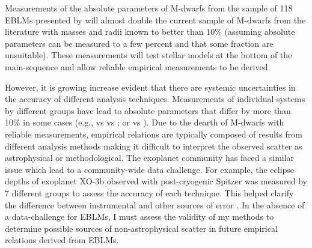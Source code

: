Measurements of the absolute parameters of M-dwarfs from the sample of 118 EBLMs presented by \citet{Triaud2017} will almost double the current sample of M-dwarfs from the literature with masses and radii known to better than 10\% (assuming absolute parameters can be measured to a few percent and that some fraction are unsuitable). These measurements will test stellar models at the bottom of the main-sequence and allow reliable empirical measurements to be derived. 

However, it is growing increase evident that there are systemic uncertainties in the accuracy of different analysis techniques. Measurements of individual systems by different groups have lead to absolute parameters that differ by more than 10\% in some cases (e.g., \citealt{2013MNRAS.429...85C} vs \citealt{2017A&A...600A..55I} vs \citealt{2017AJ....154..100H}; or \citealt{2017ApJ...845...72K} vs \citealt{2017ApJ...849...11G}). Due to the dearth of M-dwarfs with reliable measurements, empirical relations are typically composed of results from different analysis methods making it difficult to interpret the observed scatter as astrophysical or methodological. The exoplanet community has faced a similar issue which lead to a community-wide data challenge. For example, the eclipse depths of exoplanet XO-3b observed with post-cryogenic Spitzer was measured by 7 different groups to assess the accuracy of each technique. This helped clarify the difference between instrumental and other sources of error \citep{2016AJ....152...44I}. In the absence of a data-challenge for EBLMs, I must assess the validity of my methods to determine possible sources of non-astrophysical scatter in future empirical relations derived from EBLMs.  






